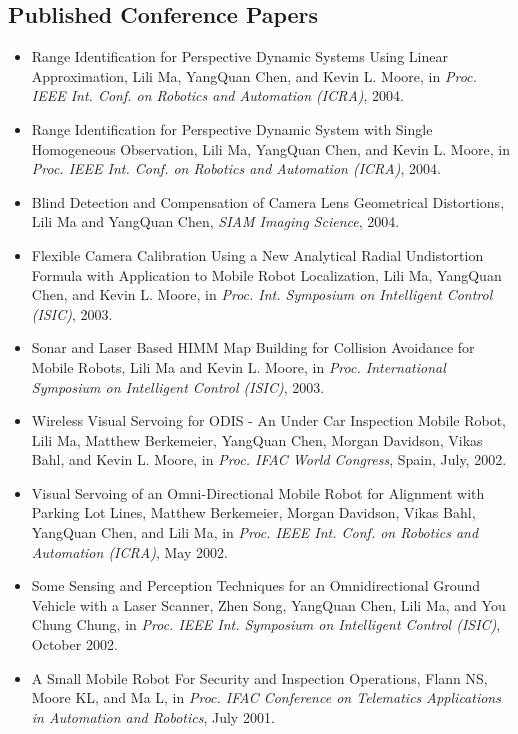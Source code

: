 \begin{vita}
\section*{Published Conference Papers}
    \begin{itemize}
    \item Range Identification for Perspective Dynamic Systems Using
      Linear Approximation, Lili Ma, YangQuan Chen, and Kevin
      L. Moore, in {\it Proc. IEEE Int. Conf. on Robotics and
        Automation (ICRA)},
    2004.
  \item Range Identification for Perspective Dynamic System with
    Single Homogeneous Observation, Lili Ma, YangQuan Chen, and Kevin
    L. Moore, in {\it Proc. IEEE Int. Conf. on Robotics and Automation (ICRA)},
    2004.
  \item Blind Detection and Compensation of Camera Lens Geometrical
    Distortions, Lili Ma and YangQuan Chen, {\it SIAM Imaging
      Science}, 2004.
  \item Flexible Camera Calibration Using a New Analytical Radial
    Undistortion Formula with Application to Mobile Robot
    Localization, Lili Ma, YangQuan Chen, and Kevin L. Moore, in {\it
      Proc. Int. Symposium on Intelligent Control (ISIC)}, 2003.
  \item Sonar and Laser Based HIMM Map Building for Collision
    Avoidance for Mobile Robots, Lili Ma and Kevin L. Moore, in {\it
      Proc. International Symposium on Intelligent Control (ISIC)},
    2003.
  \item Wireless Visual Servoing for ODIS - An Under Car Inspection
    Mobile Robot, Lili Ma, Matthew Berkemeier, YangQuan Chen, Morgan
    Davidson, Vikas Bahl, and Kevin L. Moore, in {\it Proc. IFAC World
      Congress}, Spain, July, 2002.
  \item Visual Servoing of an Omni-Directional Mobile Robot for
    Alignment with Parking Lot Lines, Matthew Berkemeier, Morgan
    Davidson, Vikas Bahl, YangQuan Chen, and Lili Ma, in {\it Proc.
      IEEE Int.  Conf. on Robotics and Automation (ICRA)}, May 2002.
  \item Some Sensing and Perception Techniques for an Omnidirectional
    Ground Vehicle with a Laser Scanner, Zhen Song, YangQuan Chen,
    Lili Ma, and You Chung Chung, in {\it Proc. IEEE Int. Symposium on
      Intelligent Control (ISIC)}, October 2002.
  \item A Small Mobile Robot For Security and Inspection Operations,
    Flann NS, Moore KL, and Ma L, in {\it Proc. IFAC Conference on Telematics
      Applications in Automation and Robotics}, July 2001.
    \end{itemize}

\end{vita}
